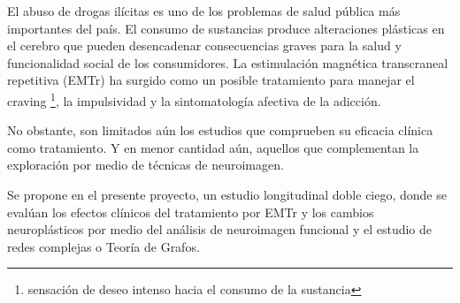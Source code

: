 El abuso de drogas ilícitas es uno de los problemas de salud pública más
importantes del país. El consumo de sustancias produce alteraciones plásticas en el
cerebro que pueden desencadenar consecuencias graves para la salud y funcionalidad
social de los consumidores. La estimulación magnética transcraneal repetitiva
(EMTr) ha surgido como un posible tratamiento para manejar el craving
\footnote{sensación de deseo intenso hacia el consumo de la sustancia},
la impulsividad y la sintomatología afectiva de la adicción. \par
No obstante, son limitados aún los estudios que comprueben su eficacia clínica
como tratamiento. Y en menor cantidad aún, aquellos que complementan la exploración
 por medio de técnicas de neuroimagen. \par
Se propone en el presente proyecto, un estudio longitudinal
doble ciego, donde se evalúan los efectos clínicos del tratamiento por EMTr y los
cambios neuroplásticos por medio del análisis de neuroimagen funcional y el estudio
de redes complejas o Teoría de Grafos.
